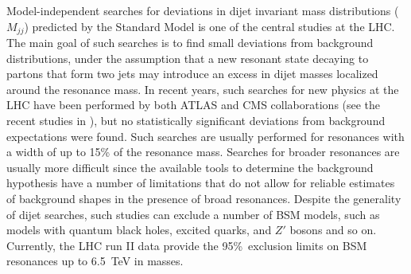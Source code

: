 \subsubsection{}
%
%
%
%
%
%
%

Model-independent searches for deviations in dijet invariant mass distributions ($M_{jj}$) predicted by the Standard Model is one of the central studies at the LHC.
The main goal of such searches is to find small deviations from background distributions, under the assumption that a new resonant state decaying to partons that form two jets may introduce an excess in dijet masses localized around the resonance mass.
In recent years, such searches for new physics at the LHC have been performed  by both ATLAS and CMS collaborations (see the recent studies in ), but no statistically significant deviations from background expectations were found. Such searches are usually performed for resonances with a width of up to 15\% of the resonance mass. Searches for broader resonances are usually more 
difficult since the available tools to determine the background 
hypothesis have a number of limitations that do not allow for 
reliable estimates of background shapes in the presence of broad resonances.  
Despite the generality of dijet searches, such studies can exclude a number of BSM models, such as models with  quantum black holes, excited quarks, and $Z'$ bosons and so on.
Currently, the LHC run II data provide the 95\%~\cl exclusion limits on BSM resonances up to 6.5~TeV in masses.

